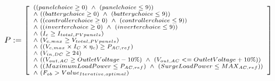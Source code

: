 \documentclass[12pt,a4paper]{article}
\begin{document}
\begin{equation}              
\label{eq:quant_free_formulae_p}
\begin{scriptsize}
P := \left [ \begin{array}{ll} 
	((panelchoice \geq 0) \, \, \wedge \, \, (panelchoice \leq 9)) \\
	\wedge \, \, ((batterychoice \geq 0) \, \, \wedge \, \, (batterychoice \leq 9)) \\
	\wedge \, \, ((controllerchoice \geq 0) \, \, \wedge \, \, (controllerchoice \leq 9)) \\
	\wedge \, \, ((inverterchoice \geq 0) \, \, \wedge \, \, (inverterchoice \leq 9)) \\
	\wedge \, \, (I_{c} \geq I_{total,PVpanels}) \\
	\wedge \, \, (V_{c,max} \geq V_{total,PVpanels}) \\
	\wedge \, \, ((V_{c,max} \times I_{C} \times \eta_{c}) \geq P_{AC,ref}) \\
	\wedge \, \, (V_{in,DC} \geq 24)  \\
	\wedge \, \, ((V_{out,AC} \geq OutletVoltage-10\%) \, \, \wedge \, \, (V_{out,AC} <= OutletVoltage+10\%)) \\
	\wedge \, \, ((MaximumLoadPower \leq P_{AC,ref}) \, \, \wedge \, \, (SurgeLoadPower \leq MAX_{AC,ref})) \\
	\wedge \, \, (F_{ob} > Value_{Iterative,optimal}) \\
              \end{array} \right ]  \\
\end{scriptsize}
\end{equation}
\end{document}
